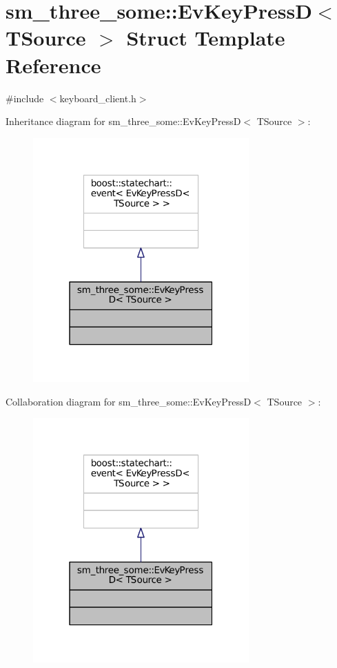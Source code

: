 \hypertarget{structsm__three__some_1_1EvKeyPressD}{}\section{sm\+\_\+three\+\_\+some\+:\+:Ev\+Key\+PressD$<$ T\+Source $>$ Struct Template Reference}
\label{structsm__three__some_1_1EvKeyPressD}


{\ttfamily \#include $<$keyboard\+\_\+client.\+h$>$}



Inheritance diagram for sm\+\_\+three\+\_\+some\+:\+:Ev\+Key\+PressD$<$ T\+Source $>$\+:
\nopagebreak
\begin{figure}[H]
\begin{center}
\leavevmode
\includegraphics[width=235pt]{structsm__three__some_1_1EvKeyPressD__inherit__graph}
\end{center}
\end{figure}


Collaboration diagram for sm\+\_\+three\+\_\+some\+:\+:Ev\+Key\+PressD$<$ T\+Source $>$\+:
\nopagebreak
\begin{figure}[H]
\begin{center}
\leavevmode
\includegraphics[width=235pt]{structsm__three__some_1_1EvKeyPressD__coll__graph}
\end{center}
\end{figure}


